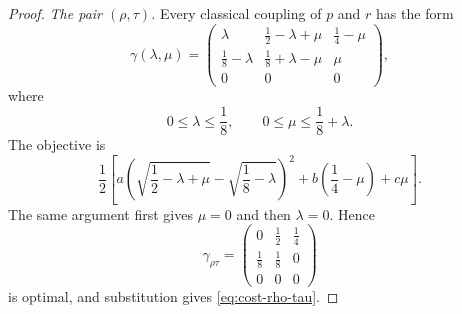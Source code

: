 \documentclass[11pt]{article}
\begin{document}
\begin{proof}
    \smallskip
    \noindent\emph{The pair $(\rho,\tau)$.}
    Every classical coupling of $p$ and $r$ has the form
    \begin{equation}\label{eq:coupling-rho-tau-parametrization}
        \gamma(\lambda,\mu)=
        \begin{pmatrix}
            \lambda&\frac12-\lambda+\mu&\frac14-\mu\\
            \frac18-\lambda&\frac18+\lambda-\mu&\mu\\
            0&0&0
        \end{pmatrix},
    \end{equation}
    where
    \[
        0\leq\lambda\leq\frac18,
        \qquad
        0\leq\mu\leq\frac18+\lambda.
    \]
    The objective is
    \[
        \frac12\left[
        a\left(\sqrt{\frac12-\lambda+\mu}
          -\sqrt{\frac18-\lambda}\right)^2
        +b\left(\frac14-\mu\right)+c\mu
        \right].
    \]
    The same argument first gives $\mu=0$ and then $\lambda=0$.  Hence
    \begin{equation}\label{eq:optimal-coupling-rho-tau}
        \gamma_{\rho\tau}=
        \begin{pmatrix}
            0&\frac12&\frac14\\
            \frac18&\frac18&0\\
            0&0&0
        \end{pmatrix}
    \end{equation}
    is optimal, and substitution gives \eqref{eq:cost-rho-tau}.


\end{proof}
\end{document}
